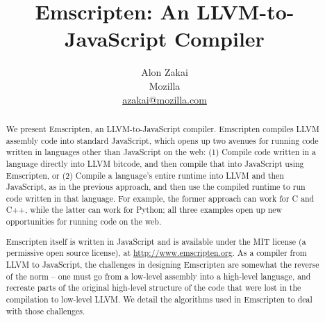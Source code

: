 \documentclass[11pt]{proc}
\begin{document}


\title{Emscripten: An LLVM-to-JavaScript Compiler}


\author{Alon Zakai \\ Mozilla \\ \url{azakai@mozilla.com}}

\maketitle

\begin{abstract}
We present Emscripten, an LLVM-to-JavaScript compiler. Emscripten compiles
LLVM assembly code into standard JavaScript, which opens up two avenues for running code written
in languages other than JavaScript on the web: (1) Compile code written in a language directly into LLVM bitcode, and
then compile that into JavaScript using Emscripten, or (2) Compile
a language's entire runtime into LLVM and then JavaScript, as in the previous
approach, and then use the compiled runtime to run code written in that language. For example, the
former approach can work for C and C++, while the latter can work for Python; all three
examples open up new opportunities for running code on the web.

Emscripten itself is written in JavaScript and is available under the MIT
license (a permissive open source license), at \url{http://www.emscripten.org}.
As a compiler from LLVM to JavaScript, the challenges in designing
Emscripten are somewhat the reverse of the norm -- one must go from a low-level
assembly into a high-level language, and recreate parts of the original
high-level structure of the code that were lost in the compilation to
low-level LLVM. We detail the algorithms used in
Emscripten to deal with those challenges.
\end{abstract}



\end{document}
